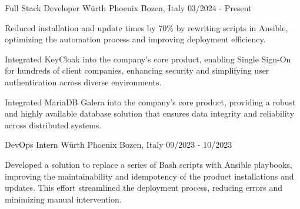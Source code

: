 
\begin{cventries}

	\cventry
	{Full Stack Developer} %
	{Würth Phoenix} %
	{Bozen, Italy} %
	{03/2024 - Present} %
	{
		\begin{cvitems} %
			\item Reduced installation and update times by 70\% by rewriting scripts in Ansible, optimizing the automation process and improving deployment efficiency.
			\item Integrated KeyCloak into the company's core product, enabling Single Sign-On for hundreds of client companies, enhancing security and simplifying user authentication across diverse environments.
			\item Integrated MariaDB Galera into the company's core product, providing a robust and highly available database solution that ensures data integrity and reliability across distributed systems.
		\end{cvitems}
	}


	\cventry
	{DevOps Intern} %
	{Würth Phoenix} %
	{Bozen, Italy} %
	{09/2023 - 10/2023} %
	{
		\begin{cvitems} %
			\item Developed a solution to replace a series of Bash scripts with Ansible playbooks, improving the maintainability and idempotency of the product installations and updates. This effort streamlined the deployment process, reducing errors and minimizing manual intervention.
		\end{cvitems}
	}

\end{cventries}
